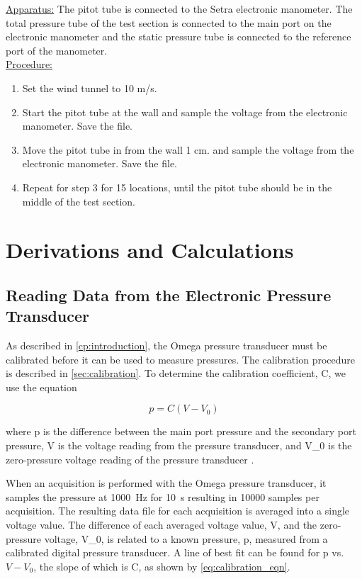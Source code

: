 \underline{Apparatus:} The pitot tube is connected to the Setra electronic manometer. The total pressure tube of the test section is connected to the main port on the electronic manometer and the static pressure tube is connected to the reference port of the manometer. \\
\underline{Procedure:}
\begin{enumerate}
    \item Set the wind tunnel to 10 m/s. 
    \item Start the pitot tube at the wall and sample the voltage from the electronic manometer. Save the file. 
    \item Move the pitot tube in from the wall 1 cm. and sample the voltage from the electronic manometer. Save the file.  
    \item Repeat for step 3 for 15 locations, until the pitot tube should be in the middle of the test section.
\end{enumerate}

\section{Derivations and Calculations}

\subsection{Reading Data from the Electronic Pressure Transducer}

As described in \autoref{cp:introduction}, the Omega pressure transducer must be calibrated before it can be used to measure pressures. The calibration procedure is described in \autoref{sec:calibration}. To determine the calibration coefficient, \gls{C}, we use the equation

\begin{equation}\label{eq:calibration_eqn}
    p = C(V - V_0)
\end{equation}

\noindent{}where \gls{p} is the difference between the main port pressure and the secondary port pressure, \gls{V} is the voltage reading from the pressure transducer, and \gls{V_0} is the zero-pressure voltage reading of the pressure transducer \citep{lab3-manual}.

When an acquisition is performed with the Omega pressure transducer, it samples the pressure at \qty{1000}{\hertz} for \qty{10}{\second} resulting in \num{10000} samples per acquisition. The resulting data file for each acquisition is averaged into a single voltage value. The difference of each averaged voltage value, \gls{V}, and the zero-pressure voltage, \gls{V_0}, is related to a known pressure, \gls{p}, measured from a calibrated digital pressure transducer. A line of best fit can be found for \gls{p} vs. $V - V_0$, the slope of which is \gls{C}, as shown by \autoref{eq:calibration_eqn}.

